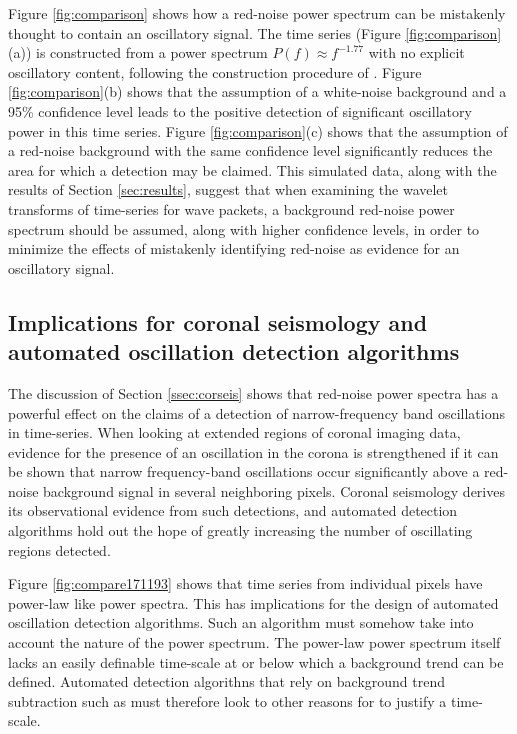\documentclass[manuscript]{../aastex52/aastex}
\begin{document}
Figure \ref{fig:comparison} shows how a red-noise power spectrum can
be mistakenly thought to contain an oscillatory signal.  The time
series (Figure \ref{fig:comparison}(a)) is constructed from a power
spectrum $P(f)\approx f^{-1.77}$ with no explicit oscillatory content,
following the construction procedure of \cite{vaughan2010}.  Figure
\ref{fig:comparison}(b) shows that the assumption of a white-noise
background and a 95\% confidence level leads to the positive detection
of significant oscillatory power in this time series. Figure
\ref{fig:comparison}(c) shows that the assumption of a red-noise
background with the same confidence level significantly reduces the
area for which a detection may be claimed.  This simulated data, along
with the results of Section \ref{sec:results}, suggest that when
examining the wavelet transforms of time-series for wave packets, a
background red-noise power spectrum should be assumed, along with
higher confidence levels, in order to minimize the effects of
mistakenly identifying red-noise as evidence for an oscillatory
signal.

\subsection{Implications for coronal seismology and automated
  oscillation detection algorithms}\label{sec:oscdetect}

The discussion of Section \ref{ssec:corseis} shows that red-noise
power spectra has a powerful effect on the claims of a detection of
narrow-frequency band oscillations in time-series.  When looking at
extended regions of coronal imaging data, evidence for the presence of
an oscillation in the corona is strengthened if it can be shown that
narrow frequency-band oscillations occur significantly above a
red-noise background signal in several neighboring pixels.  Coronal
seismology derives its observational evidence from such detections,
and automated detection algorithms hold out the hope of greatly
increasing the number of oscillating regions detected.

Figure \ref{fig:compare171193} shows that time series from individual
pixels have power-law like power spectra.  This has implications for
the design of automated oscillation detection algorithms.  Such an
algorithm must somehow take into account the nature of the power
spectrum.  The power-law power spectrum itself lacks an easily
definable time-scale at or below which a background trend can be
defined.  Automated detection algorithns that rely on background trend
subtraction such as \cite{2010SoPh..264..403I} must therefore look to
other reasons for to justify a time-scale.
\end{document}
